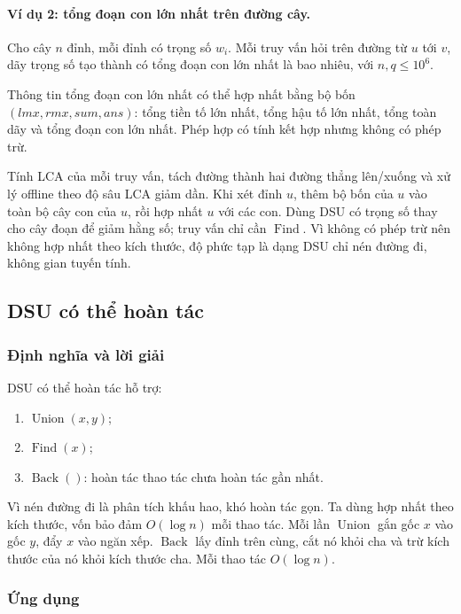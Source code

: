 \documentclass[11pt]{article}
\begin{document}
\paragraph{Ví dụ 2: tổng đoạn con lớn nhất trên đường cây.}
Cho cây \(n\) đỉnh, mỗi đỉnh có trọng số \(w_i\). Mỗi truy vấn hỏi trên đường
từ \(u\) tới \(v\), dãy trọng số tạo thành có tổng đoạn con lớn nhất là bao
nhiêu, với \(n,q\le 10^6\).

Thông tin tổng đoạn con lớn nhất có thể hợp nhất bằng bộ bốn
\((lmx,rmx,sum,ans)\): tổng tiền tố lớn nhất, tổng hậu tố lớn nhất, tổng toàn
dãy và tổng đoạn con lớn nhất. Phép hợp có tính kết hợp nhưng không có phép
trừ.

Tính LCA của mỗi truy vấn, tách đường thành hai đường thẳng lên/xuống và xử lý
offline theo độ sâu LCA giảm dần. Khi xét đỉnh \(u\), thêm bộ bốn của \(u\) vào
toàn bộ cây con của \(u\), rồi hợp nhất \(u\) với các con. Dùng DSU có trọng số
thay cho cây đoạn để giảm hằng số; truy vấn chỉ cần \(\operatorname{Find}\).
Vì không có phép trừ nên không hợp nhất theo kích thước, độ phức tạp là dạng
DSU chỉ nén đường đi, không gian tuyến tính.

\subsection{DSU có thể hoàn tác}

\subsubsection{Định nghĩa và lời giải}

DSU có thể hoàn tác hỗ trợ:
\begin{enumerate}
  \item \(\operatorname{Union}(x,y)\);
  \item \(\operatorname{Find}(x)\);
  \item \(\operatorname{Back}()\): hoàn tác thao tác chưa hoàn tác gần nhất.
\end{enumerate}
Vì nén đường đi là phân tích khấu hao, khó hoàn tác gọn. Ta dùng hợp nhất theo
kích thước, vốn bảo đảm \(O(\log n)\) mỗi thao tác. Mỗi lần \(\operatorname{Union}\)
gắn gốc \(x\) vào gốc \(y\), đẩy \(x\) vào ngăn xếp. \(\operatorname{Back}\)
lấy đỉnh trên cùng, cắt nó khỏi cha và trừ kích thước của nó khỏi kích thước
cha. Mỗi thao tác \(O(\log n)\).

\subsubsection{Ứng dụng}
\end{document}
